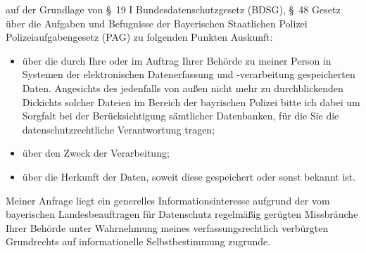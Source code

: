 auf der Grundlage von §~19 I Bundesdatenschutzgesetz (BDSG),
§~48 Gesetz über die Aufgaben und Befugnisse der Bayerischen Staatlichen Polizei
Polizeiaufgabengesetz (PAG) zu folgenden Punkten Auskunft:

\begin{itemize}
  \item über die durch Ihre oder im Auftrag Ihrer Behörde zu meiner Person in Systemen
  der elektronischen Datenerfassung und -verarbeitung gespeicherten Daten. Angesichts
  des jedenfalls von außen nicht mehr zu durchblickenden Dickichts solcher Dateien
  im Bereich der bayrischen Polizei bitte ich dabei um Sorgfalt bei der Berücksichtigung
  sämtlicher Datenbanken, für die Sie die datenschutzrechtliche Verantwortung tragen;

  \item über den Zweck der Verarbeitung;

  \item über die Herkunft der Daten, soweit diese gespeichert oder sonst bekannt ist.
\end{itemize}

Meiner Anfrage liegt ein generelles Informationsinteresse aufgrund der vom
bayerischen Landesbeauftragen für Datenschutz regelmäßig gerügten Missbräuche
Ihrer Behörde unter Wahrnehmung meines verfassungsrechtlich verbürgten
Grundrechts auf informationelle Selbstbestimmung zugrunde.

